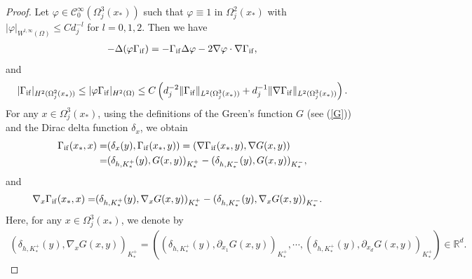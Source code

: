 \documentclass[1996/10/24]{amsart}
\theoremstyle{definition}
\numberwithin{equation}{section}
\begin{document}
\begin{proof}
Let $\varphi\in\mathcal{C}_0^{\infty}(\Omega_j^3(x_{\ast}))$ such that $\varphi\equiv 1$ in $\Omega_j^2(x_{\ast})$ with
$|\varphi|_{W^{l,\infty}(\Omega)}\leq Cd_j^{-l}$ for $l=0,1,2$. Then we have
\begin{align*}
-\Delta(\varphi\Gamma_{{\rm if}})=-\Gamma_{{\rm if}}\Delta\varphi-2\nabla\varphi\cdot\nabla\Gamma_{{\rm if}},
\end{align*}
and
\begin{align}
|\Gamma_{{\rm if}}|_{H^2(\Omega_j^2(x_{\ast}))}\leq |\varphi\Gamma_{{\rm if}}|_{H^2(\Omega)}\leq C\left(d_j^{-2}\|\Gamma_{{\rm if}}\|_{L^2(\Omega_j^3(x_{\ast}))}+d_j^{-1}\|\nabla\Gamma_{{\rm if}}\|_{L^2(\Omega_j^3(x_{\ast}))}\right).\label{ee-rG23-proof:1}
\end{align}
For any $x\in\Omega_j^3(x_{\ast})$, using the definitions of the Green's function $G$ (see (\ref{G})) and the Dirac delta function $\delta_x$, we obtain
\begin{align}
\Gamma_{{\rm if}}(x_{\ast},x)=&(\delta_x(y),\Gamma_{{\rm if}}(x_{\ast},y))
= (\nabla\Gamma_{{\rm if}}(x_{\ast},y),\nabla G(x,y)) \label{ee-rG23-proof:ad1}\\
=& (\delta_{h,K_{\ast}^+}(y), G(x,y))_{K_{\ast}^+}-(\delta_{h,K_{\ast}^-}(y),G(x,y))_{K_{\ast}^-},
\nonumber
\end{align}
and
\begin{align}
\nabla_x\Gamma_{{\rm if}}(x_{\ast},x)=& (\delta_{h,K_{\ast}^+}(y), \nabla_xG(x,y))_{K_{\ast}^+}-(\delta_{h,K_{\ast}^-}(y),\nabla_xG(x,y))_{K_{\ast}^-} .\label{ee-rG23-proof:ad2}
\end{align}
Here, for any $x\in\Omega_j^3(x_{\ast})$, we denote by
\begin{align*}
(\delta_{h,K_{\ast}^+}(y), \nabla_xG(x,y))_{K_{\ast}^+}
= \left( (\delta_{h,K_{\ast}^+}(y), \partial_{x_{1}} G(x,y))_{K_{\ast}^+}, \cdots,
(\delta_{h,K_{\ast}^+}(y), \partial_{x_{d}} G(x,y))_{K_{\ast}^+} \right)\in \mathbb{R}^{d}.
\end{align*}


\end{proof}
\end{document}
